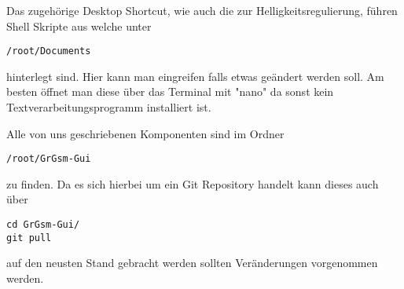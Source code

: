 Das zugehörige Desktop Shortcut, wie auch die zur Helligkeitsregulierung, führen Shell Skripte aus welche unter 
\begin{verbatim}
/root/Documents
\end{verbatim}
hinterlegt sind. Hier kann man eingreifen falls etwas geändert werden soll. Am besten öffnet man diese über das Terminal mit "nano" da sonst kein Textverarbeitungsprogramm installiert ist. 

Alle von uns geschriebenen Komponenten sind im Ordner 
\begin{verbatim}
/root/GrGsm-Gui
\end{verbatim}
zu finden. Da es sich hierbei um ein Git Repository handelt kann dieses auch über 
\begin{verbatim}
cd GrGsm-Gui/
git pull
\end{verbatim}
auf den neusten Stand gebracht werden sollten Veränderungen vorgenommen werden. 
